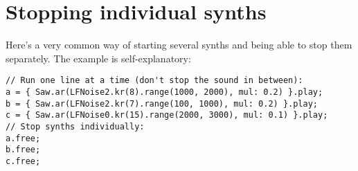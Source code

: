 \section{Stopping individual synths}

Here's a very common way of starting several synths and being able to stop them separately. The example is self-explanatory:

\begin{lstlisting}[style=SuperCollider-IDE, basicstyle=\scttfamily\footnotesize]
// Run one line at a time (don't stop the sound in between):
a = { Saw.ar(LFNoise2.kr(8).range(1000, 2000), mul: 0.2) }.play;
b = { Saw.ar(LFNoise2.kr(7).range(100, 1000), mul: 0.2) }.play;
c = { Saw.ar(LFNoise0.kr(15).range(2000, 3000), mul: 0.1) }.play;
// Stop synths individually:
a.free;
b.free;
c.free; 	
\end{lstlisting}
